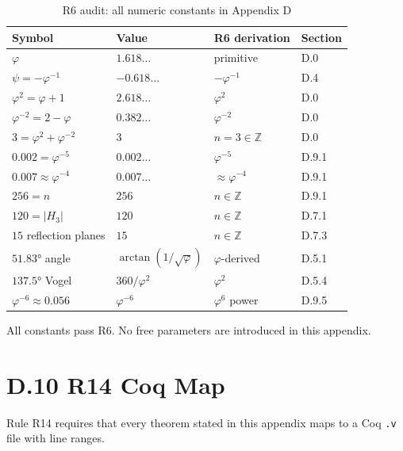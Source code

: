 \begin{table}[h]
\centering
\caption{R6 audit: all numeric constants in Appendix D}
\begin{tabular}{llll}
\toprule
Symbol & Value & R6 derivation & Section \\
\midrule
$\varphi$ & $1.618\ldots$ & primitive & D.0 \\
$\psi = -\varphi^{-1}$ & $-0.618\ldots$ & $-\varphi^{-1}$ & D.4 \\
$\varphi^2 = \varphi+1$ & $2.618\ldots$ & $\varphi^2$ & D.0 \\
$\varphi^{-2} = 2-\varphi$ & $0.382\ldots$ & $\varphi^{-2}$ & D.0 \\
$3 = \varphi^2+\varphi^{-2}$ & $3$ & $n=3\in\mathbb{Z}$ & D.0 \\
$0.002 = \varphi^{-5}$ & $0.002\ldots$ & $\varphi^{-5}$ & D.9.1 \\
$0.007 \approx \varphi^{-4}$ & $0.007\ldots$ & $\approx\varphi^{-4}$ & D.9.1 \\
$256 = n$ & $256$ & $n\in\mathbb{Z}$ & D.9.1 \\
$120 = |H_3|$ & $120$ & $n\in\mathbb{Z}$ & D.7.1 \\
$15$ reflection planes & $15$ & $n\in\mathbb{Z}$ & D.7.3 \\
$51.83°$ angle & $\arctan(1/\sqrt\varphi)$ & $\varphi$-derived & D.5.1 \\
$137.5°$ Vogel & $360/\varphi^2$ & $\varphi^2$ & D.5.4 \\
$\varphi^{-6}\approx 0.056$ & $\varphi^{-6}$ & $\varphi^6$ power & D.9.5 \\
\bottomrule
\end{tabular}
\end{table}

All constants pass R6. No free parameters are introduced in this appendix.

\section*{D.10  R14 Coq Map}

Rule R14 requires that every theorem stated in this appendix maps to a Coq
\texttt{.v} file with line ranges.

